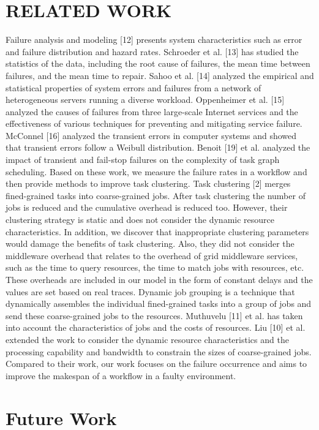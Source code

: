 \documentclass{IOS-Book-Article}
\begin{document}
\section{RELATED WORK}
Failure analysis and modeling [12] presents system characteristics such as error and failure distribution and hazard rates. Schroeder et al. [13] has studied the statistics of the data, including the root cause of failures, the mean time between failures, and the mean time to repair. Sahoo et al. [14] analyzed the empirical and statistical properties of system errors and failures from a network of heterogeneous servers running a diverse workload. Oppenheimer et al. [15] analyzed the causes of failures from three large-scale Internet services and the effectiveness of various techniques for preventing and mitigating service failure. McConnel [16] analyzed the transient errors in computer systems and showed that transient errors follow a Weibull distribution. Benoit [19] et al. analyzed the impact of transient and fail-stop failures on the complexity of task graph scheduling. Based on these work, we measure the failure rates in a workflow and then provide methods to improve task clustering.  
Task clustering [2] merges fined-grained tasks into coarse-grained jobs. After task clustering the number of jobs is reduced and the cumulative overhead is reduced too. However, their clustering strategy is static and does not consider the dynamic resource characteristics. In addition, we discover that inappropriate clustering parameters would damage the benefits of task clustering. Also, they did not consider the middleware overhead that relates to the overhead of grid middleware services, such as the time to query resources, the time to match jobs with resources, etc. These overheads are included in our model in the form of constant delays and the values are set based on real traces. 
Dynamic job grouping is a technique that dynamically assembles the individual fined-grained tasks into a group of jobs and send these coarse-grained jobs to the resources.  Muthuvelu [11] et al. has taken into account the characteristics of jobs and the costs of resources. Liu [10] et al. extended the work to consider the dynamic resource characteristics and the processing capability and bandwidth to constrain the sizes of coarse-grained jobs. Compared to their work, our work focuses on the failure occurrence and aims to improve the makespan of a workflow in a faulty environment. 

\section{Future Work}
\end{document}
